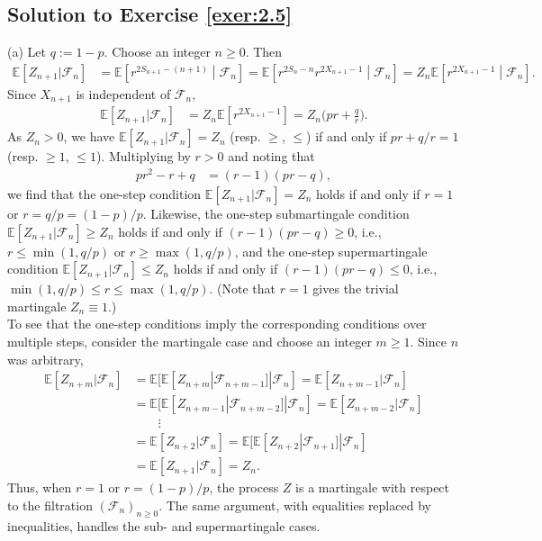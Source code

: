 \documentclass[12pt]{book}
\numberwithin{equation}{chapter}
\theoremstyle{plain}
\numberwithin{theorem}{section}
\theoremstyle{definition}
\numberwithin{exercise}{chapter}
\newcommand{\<}{\langle}
\renewcommand{\>}{\rangle}
\renewcommand{\(}{\left(}
\renewcommand{\)}{\right)}
\renewcommand{\[}{\left[}
\renewcommand{\]}{\right]}
\newcommand\Eb{\mathds{E}}
\newcommand\Fc{\mathscr{F}}
\begin{document}
\subsection*{Solution to Exercise \ref{exer:2.5}}
(a) Let $q := 1-p$.  Choose an integer $n \geq 0$. Then
\begin{align}
\Eb[ Z_{n+1} | \Fc_n]
	&= \Eb\[ r^{2 S_{n+1} - (n+1)} \middle\vert \Fc_{n}\]
	 = \Eb\[ r^{2S_n - n} r^{2X_{n+1} - 1}  \middle\vert \Fc_{n}\]
	 = Z_n  \Eb\[ r^{2X_{n+1} -1} \middle\vert \Fc_{n}\].
\end{align}
Since $X_{n+1}$ is independent of $\Fc_n$,
\begin{align}
\Eb[ Z_{n+1} | \Fc_n]
	&= Z_n \Eb\[ r^{2X_{n+1} -1} \]
	 = Z_n \Big( p r + \frac{q}{r} \Big) .
\end{align}
As $Z_n > 0$, we have $\Eb[ Z_{n+1} | \Fc_n] = Z_n$ (resp. $\geq$, $\leq$) if and only if $p r + q/r = 1$ (resp. $\geq 1$, $\leq 1$).  Multiplying by $r > 0$ and noting that
\begin{align}
p r^2 - r + q
	&=	(r - 1)(p r - q) ,
\end{align}
we find that the one-step condition $\Eb[ Z_{n+1} | \Fc_n] = Z_n$ holds if and only if $r = 1$ or $r = q/p = (1-p)/p$.  Likewise, the one-step submartingale condition $\Eb[ Z_{n+1} | \Fc_n] \geq Z_n$ holds if and only if $(r-1)(pr - q) \geq 0$, i.e., $r \leq \min(1,q/p)$ or $r \geq \max(1,q/p)$, and the one-step supermartingale condition $\Eb[ Z_{n+1} | \Fc_n] \leq Z_n$ holds if and only if $(r-1)(pr - q) \leq 0$, i.e., $\min(1,q/p) \leq r \leq \max(1,q/p)$.
(Note that $r = 1$ gives the trivial martingale $Z_n \equiv 1$.)
\\[0.5em]
To see that the one-step conditions imply the corresponding conditions over multiple steps, consider the martingale case and choose an integer $m \geq 1$. Since $n$ was arbitrary,
\begin{align}
\Eb [ Z_{n+m} | \Fc_n]
	&= \Eb[ \Eb[ Z_{n+m} | \Fc_{n+m-1} ] | \Fc_n] 
	 = \Eb[ Z_{n + m - 1} | \Fc_n] \\
	&= \Eb[ \Eb[ Z_{n+m-1} | \Fc_{n + m - 2}] | \Fc_n] 
	 = \Eb[ Z_{n+ m - 2} | \Fc_n] \\
	&\qquad \vdots \\
	&= \Eb[ Z_{n +2 } | \Fc_n]  
	 = \Eb[ \Eb[ Z_{n+2} | \Fc_{n+1} ] | \Fc_n ] \\
	&= \Eb[ Z_{n+1} | \Fc_n] 
	 = Z_n.
\end{align}
Thus, when $r = 1$ or $r = (1-p)/p$, the process $Z$ is a martingale with respect to the filtration $( \Fc_n)_{n\geq 0}$.  The same argument, with equalities replaced by inequalities, handles the sub- and supermartingale cases.
\end{document}
